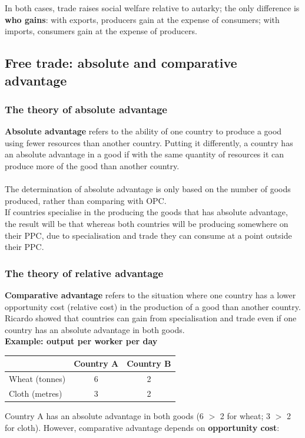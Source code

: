 \documentclass[a4paper,12pt]{article}
\newcommand{\needbold}[1]{\textcolor{red!70!black}{\textbf{#1}}}
\begin{document}
In both cases, trade raises social welfare relative to autarky; the only difference is \textbf{who gains}: with exports, producers gain at the expense of consumers; with imports, consumers gain at the expense of producers.
\subsection{Free trade: absolute and comparative advantage}
\subsubsection*{The theory of absolute advantage}
\needbold{Absolute advantage} refers to the ability of one country to produce a good using fewer resources than another country. Putting it differently, a country has an absolute advantage in a good if with the same quantity of resources it can produce more of the good than another country.\\\\
The determination of absolute advantage is only based on the number of goods produced, rather than comparing with OPC.\\
If countries specialise in the producing the goods that has absolute advantage, the result will be that whereas both countries will be producing somewhere on their PPC, due to specialisation and trade they can consume at a point outside their PPC.
\subsubsection*{The theory of relative advantage}
\needbold{Comparative advantage} refers to the situation where one country has a lower opportunity cost (relative cost) in the production of a good than another country.\\
Ricardo showed that countries can gain from specialisation and trade even if one country has an absolute advantage in both goods.\\
\textbf{Example: output per worker per day}
\begin{center}
\begin{tabular}{lcc}
\toprule
& \textbf{Country A} & \textbf{Country B} \\
\midrule
Wheat (tonnes) & 6 & 2 \\
Cloth (metres) & 3 & 2 \\
\bottomrule
\end{tabular}
\end{center}
Country A has an absolute advantage in both goods (6 $>$ 2 for wheat; 3 $>$ 2 for cloth). However, comparative advantage depends on \textbf{opportunity cost}:
\end{document}

